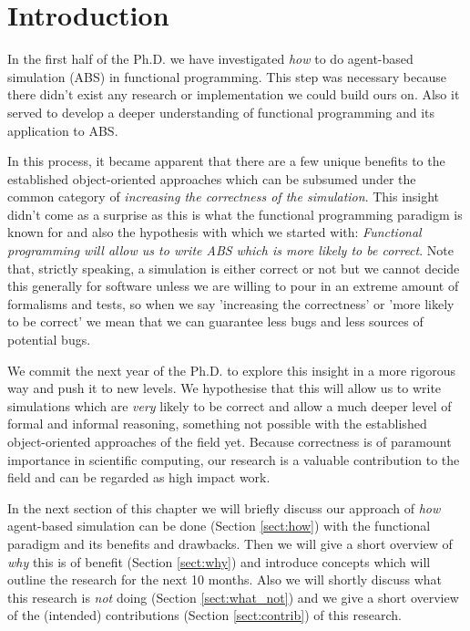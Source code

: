 \chapter{Introduction}
\label{chap:intro}
In the first half of the Ph.D. we have investigated \textit{how} to do agent-based simulation (ABS) in functional programming. This step was necessary because there didn't exist any research or implementation we could build ours on. Also it served to develop a deeper understanding of functional programming and its application to ABS.

In this process, it became apparent that there are a few unique benefits to the established object-oriented approaches which can be subsumed under the common category of \textit{increasing the correctness of the simulation}. This insight didn't come as a surprise as this is what the functional programming paradigm is known for and also the hypothesis with which we started with: \textit{Functional programming will allow us to write ABS which is more likely to be correct}. Note that, strictly speaking, a simulation is either correct or not but we cannot decide this generally for software unless we are willing to pour in an extreme amount of formalisms and tests, so when we say 'increasing the correctness' or 'more likely to be correct' we mean that we can guarantee less bugs and less sources of potential bugs.

We commit the next year of the Ph.D. to explore this insight in a more rigorous way and push it to new levels. We hypothesise that this will allow us to write simulations which are \textit{very} likely to be correct and allow a much deeper level of formal and informal reasoning, something not possible with the established object-oriented approaches of the field yet. Because correctness is of paramount importance in scientific computing, our research is a valuable contribution to the field and can be regarded as high impact work.

In the next section of this chapter we will briefly discuss our approach of \textit{how} agent-based simulation can be done (Section \ref{sect:how}) with the functional paradigm and its benefits and drawbacks. Then we will give a short overview of \textit{why} this is of benefit (Section \ref{sect:why}) and introduce concepts which will outline the research for the next 10 months. Also we will shortly discuss what this research is \textit{not} doing (Section \ref{sect:what_not}) and we give a short overview of the (intended) contributions (Section \ref{sect:contrib}) of this research. 

